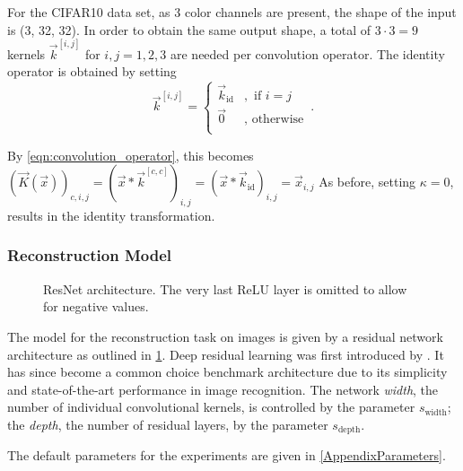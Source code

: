 For the CIFAR10 data set, as 3 color channels are present, the shape of the input is (3, 32, 32). 
In order to obtain the same output shape, 
a total of $3\cdot 3=9$ kernels $\vec k^{[i,j]}$ for $i,j=1,2,3$ are needed per convolution operator.
The identity operator is obtained by setting 
\[
    \vec k^{[i,j]} = \begin{cases}
        \vec k_{\text{id}} &, \text{ if } i = j\\
        \vec 0 &, \text{ otherwise} \\
    \end{cases} \,.
\]

By \cref{eqn:convolution_operator}, this becomes $(\vec K (\vec x))_{c,i,j}
    = \left ( \vec x * \vec k^{[c,c]} \right )_{i,j} = (\vec x * \vec k_\text{id})_{i, j} = \vec x _{i,j}$
As before, setting $\kappa = 0$, results in the identity transformation.


\subsubsection{Reconstruction Model}

\begin{figure}[!ht]
{\begin{minipage}{0.5\textwidth}
\centering

\end{minipage}
\hfill
\begin{minipage}{0.5\textwidth}
\centering

\end{minipage}}
\caption{ResNet architecture. The very last ReLU layer is omitted to allow for negative values.}
\label{fig:resnet}
\end{figure}

The model for the reconstruction task on images is given by a residual network architecture
as outlined in \cref{fig:resnet}. 
Deep residual learning was first introduced by \cite{Resnet}.
It has since become a common choice benchmark architecture due to its simplicity and state-of-the-art performance
in image recognition.
The network \textit{width}, the number of individual convolutional kernels, is controlled by the parameter $s_\text{width}$; the \textit{depth}, the number of residual layers, by the parameter
$s_\text{depth}$.

The default parameters for the experiments are given in \cref{AppendixParameters}.




